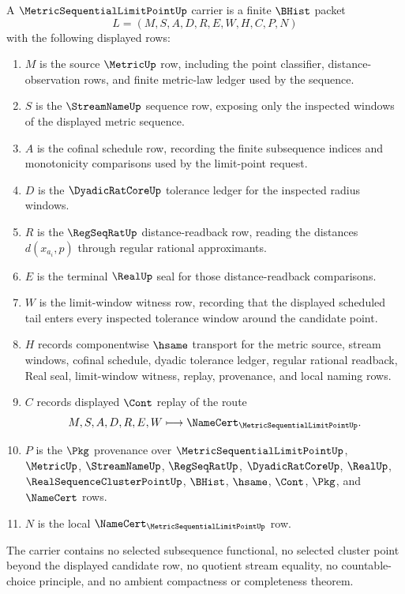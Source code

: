 \begin{definition}
\label{def:metric-sequential-limit-point-carrier}
A $\MetricSequentialLimitPointUp$ carrier is a finite $\BHist$ packet
$$
L=(M,S,A,D,R,E,W,H,C,P,N)
$$
with the following displayed rows:
\begin{enumerate}
\item $M$ is the source $\MetricUp$ row, including the point classifier, distance-observation rows, and finite metric-law ledger used by the sequence.
\item $S$ is the $\StreamNameUp$ sequence row, exposing only the inspected windows of the displayed metric sequence.
\item $A$ is the cofinal schedule row, recording the finite subsequence indices and monotonicity comparisons used by the limit-point request.
\item $D$ is the $\DyadicRatCoreUp$ tolerance ledger for the inspected radius windows.
\item $R$ is the $\RegSeqRatUp$ distance-readback row, reading the distances $d(x_{a_i},p)$ through regular rational approximants.
\item $E$ is the terminal $\RealUp$ seal for those distance-readback comparisons.
\item $W$ is the limit-window witness row, recording that the displayed scheduled tail enters every inspected tolerance window around the candidate point.
\item $H$ records componentwise $\hsame$ transport for the metric source, stream windows, cofinal schedule, dyadic tolerance ledger, regular rational readback, Real seal, limit-window witness, replay, provenance, and local naming rows.
\item $C$ records displayed $\Cont$ replay of the route
$$
M,S,A,D,R,E,W\longmapsto \NameCert_{\MetricSequentialLimitPointUp}.
$$
\item $P$ is the $\Pkg$ provenance over $\MetricSequentialLimitPointUp$, $\MetricUp$, $\StreamNameUp$, $\RegSeqRatUp$, $\DyadicRatCoreUp$, $\RealUp$, $\RealSequenceClusterPointUp$, $\BHist$, $\hsame$, $\Cont$, $\Pkg$, and $\NameCert$ rows.
\item $N$ is the local $\NameCert_{\MetricSequentialLimitPointUp}$ row.
\end{enumerate}
The carrier contains no selected subsequence functional, no selected cluster point beyond the displayed candidate row, no quotient stream equality, no countable-choice principle, and no ambient compactness or completeness theorem.
\end{definition}

